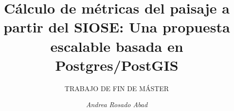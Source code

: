\title{Cálculo de métricas del paisaje a partir del SIOSE: Una propuesta escalable basada en Postgres/PostGIS}

\subtitle{TRABAJO DE FIN DE MÁSTER}


\author{\textit{Andrea Rosado Abad}}








     



\renewcommand{\submissiontext}{}

